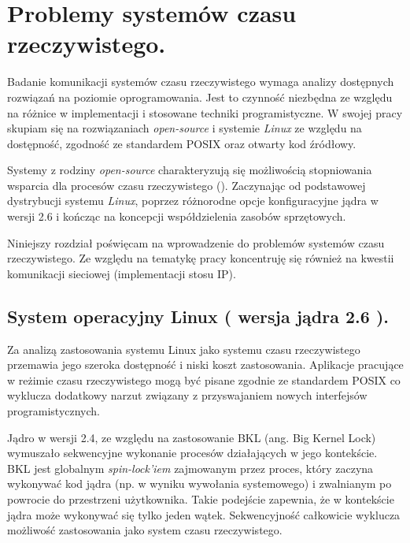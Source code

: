 
\section{Problemy systemów czasu rzeczywistego.}

Badanie komunikacji systemów czasu rzeczywistego wymaga analizy dostępnych rozwiązań na poziomie oprogramowania. Jest to czynność niezbędna ze względu na różnice w implementacji i stosowane techniki programistyczne. W swojej pracy skupiam się na rozwiązaniach \emph{open-source} i systemie \emph{Linux} ze względu na dostępność, zgodność ze standardem POSIX oraz otwarty kod źródłowy.

Systemy z rodziny \emph{open-source} charakteryzują się możliwością stopniowania wsparcia dla procesów czasu rzeczywistego (\cite{wiki:RTLinux}). Zaczynając od podstawowej dystrybucji systemu \emph{Linux}, poprzez różnorodne opcje konfiguracyjne jądra w wersji 2.6 i kończąc na koncepcji współdzielenia zasobów sprzętowych. 

Niniejszy rozdział poświęcam na wprowadzenie do problemów systemów czasu rzeczywistego. Ze względu na tematykę pracy koncentruję się również na kwestii komunikacji sieciowej (implementacji stosu IP). 

\subsection{System operacyjny Linux ( wersja jądra 2.6 ).}

Za analizą zastosowania systemu Linux jako systemu czasu rzeczywistego przemawia jego szeroka dostępność i niski koszt zastosowania. Aplikacje pracujące w reżimie czasu rzeczywistego mogą być pisane zgodnie ze standardem POSIX co wyklucza dodatkowy narzut związany z przyswajaniem nowych interfejsów programistycznych. 

Jądro w wersji 2.4, ze względu na zastosowanie BKL (ang. Big Kernel Lock) wymuszało sekwencyjne wykonanie procesów działających w jego kontekście. BKL jest globalnym \emph{spin-lock'iem} zajmowanym przez proces, który zaczyna wykonywać kod jądra (np. w wyniku wywołania systemowego) i zwalnianym po powrocie do przestrzeni użytkownika. Takie podejście zapewnia, że w kontekście jądra może wykonywać się tylko jeden wątek. Sekwencyjność całkowicie wyklucza możliwość zastosowania jako system czasu rzeczywistego. 

